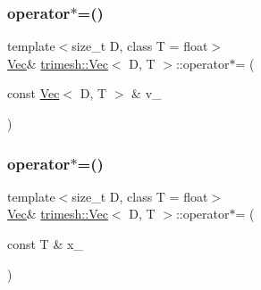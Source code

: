 \mbox{\label{classtrimesh_1_1Vec_a1094db69116d319cabca7aa09a20463d}} 
\subsubsection{\texorpdfstring{operator$\ast$=()}{operator*=()}\hspace{0.1cm}{\footnotesize\ttfamily [1/2]}}
{\footnotesize\ttfamily template$<$size\+\_\+t D, class T = float$>$ \\
\hyperlink{classtrimesh_1_1Vec}{Vec}\& \hyperlink{classtrimesh_1_1Vec}{trimesh\+::\+Vec}$<$ D, T $>$\+::operator$\ast$= (\begin{DoxyParamCaption}\item[{const \hyperlink{classtrimesh_1_1Vec}{Vec}$<$ D, T $>$ \&}]{v\+\_\+ }\end{DoxyParamCaption})\hspace{0.3cm}{\ttfamily [inline]}}

\mbox{\label{classtrimesh_1_1Vec_aad3f61a9a6a81dcfcf69e7633328f721}} 
\subsubsection{\texorpdfstring{operator$\ast$=()}{operator*=()}\hspace{0.1cm}{\footnotesize\ttfamily [2/2]}}
{\footnotesize\ttfamily template$<$size\+\_\+t D, class T = float$>$ \\
\hyperlink{classtrimesh_1_1Vec}{Vec}\& \hyperlink{classtrimesh_1_1Vec}{trimesh\+::\+Vec}$<$ D, T $>$\+::operator$\ast$= (\begin{DoxyParamCaption}\item[{const T \&}]{x\+\_\+ }\end{DoxyParamCaption})\hspace{0.3cm}{\ttfamily [inline]}}

\mbox{\label{classtrimesh_1_1Vec_a85f711a251416207c95b82dbfc3e0706}} 
